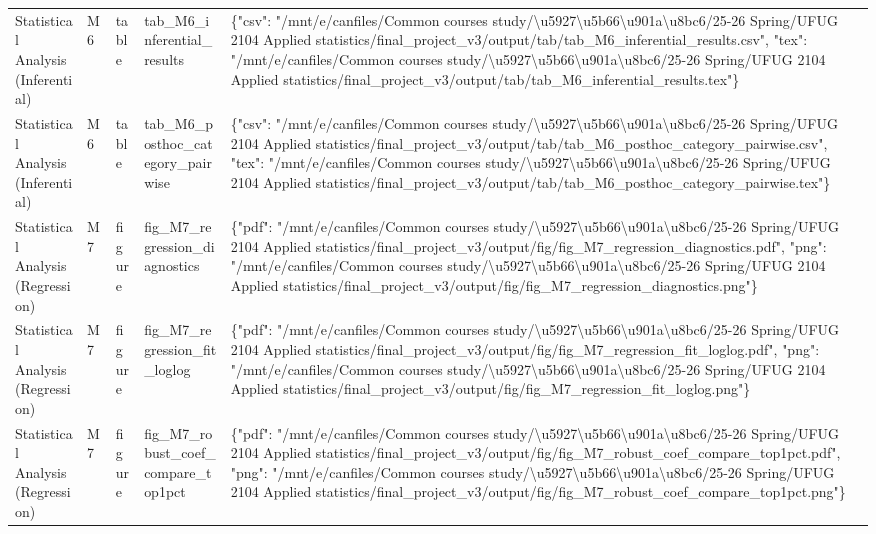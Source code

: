 \begin{tabular}{lllll}
Statistical Analysis (Inferential) & M6 & table & tab\_M6\_inferential\_results & \{"csv": "/mnt/e/canfiles/Common courses study/\textbackslash u5927\textbackslash u5b66\textbackslash u901a\textbackslash u8bc6/25-26 Spring/UFUG 2104 Applied statistics/final\_project\_v3/output/tab/tab\_M6\_inferential\_results.csv", "tex": "/mnt/e/canfiles/Common courses study/\textbackslash u5927\textbackslash u5b66\textbackslash u901a\textbackslash u8bc6/25-26 Spring/UFUG 2104 Applied statistics/final\_project\_v3/output/tab/tab\_M6\_inferential\_results.tex"\} \\
Statistical Analysis (Inferential) & M6 & table & tab\_M6\_posthoc\_category\_pairwise & \{"csv": "/mnt/e/canfiles/Common courses study/\textbackslash u5927\textbackslash u5b66\textbackslash u901a\textbackslash u8bc6/25-26 Spring/UFUG 2104 Applied statistics/final\_project\_v3/output/tab/tab\_M6\_posthoc\_category\_pairwise.csv", "tex": "/mnt/e/canfiles/Common courses study/\textbackslash u5927\textbackslash u5b66\textbackslash u901a\textbackslash u8bc6/25-26 Spring/UFUG 2104 Applied statistics/final\_project\_v3/output/tab/tab\_M6\_posthoc\_category\_pairwise.tex"\} \\
Statistical Analysis (Regression) & M7 & figure & fig\_M7\_regression\_diagnostics & \{"pdf": "/mnt/e/canfiles/Common courses study/\textbackslash u5927\textbackslash u5b66\textbackslash u901a\textbackslash u8bc6/25-26 Spring/UFUG 2104 Applied statistics/final\_project\_v3/output/fig/fig\_M7\_regression\_diagnostics.pdf", "png": "/mnt/e/canfiles/Common courses study/\textbackslash u5927\textbackslash u5b66\textbackslash u901a\textbackslash u8bc6/25-26 Spring/UFUG 2104 Applied statistics/final\_project\_v3/output/fig/fig\_M7\_regression\_diagnostics.png"\} \\
Statistical Analysis (Regression) & M7 & figure & fig\_M7\_regression\_fit\_loglog & \{"pdf": "/mnt/e/canfiles/Common courses study/\textbackslash u5927\textbackslash u5b66\textbackslash u901a\textbackslash u8bc6/25-26 Spring/UFUG 2104 Applied statistics/final\_project\_v3/output/fig/fig\_M7\_regression\_fit\_loglog.pdf", "png": "/mnt/e/canfiles/Common courses study/\textbackslash u5927\textbackslash u5b66\textbackslash u901a\textbackslash u8bc6/25-26 Spring/UFUG 2104 Applied statistics/final\_project\_v3/output/fig/fig\_M7\_regression\_fit\_loglog.png"\} \\
Statistical Analysis (Regression) & M7 & figure & fig\_M7\_robust\_coef\_compare\_top1pct & \{"pdf": "/mnt/e/canfiles/Common courses study/\textbackslash u5927\textbackslash u5b66\textbackslash u901a\textbackslash u8bc6/25-26 Spring/UFUG 2104 Applied statistics/final\_project\_v3/output/fig/fig\_M7\_robust\_coef\_compare\_top1pct.pdf", "png": "/mnt/e/canfiles/Common courses study/\textbackslash u5927\textbackslash u5b66\textbackslash u901a\textbackslash u8bc6/25-26 Spring/UFUG 2104 Applied statistics/final\_project\_v3/output/fig/fig\_M7\_robust\_coef\_compare\_top1pct.png"\} \\

\end{tabular}
